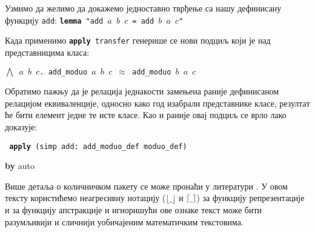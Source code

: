 Узмимо да желимо да докажемо једноставно тврђење са нашу дефинисану
функцију {\tt add}:
{\tt \textbf{lemma} "add $a$ $b$ $c$ = add $b$ $a$ $c$"}

Када применимо {\tt \textbf{apply} transfer} генерише се нови подциљ
који је над представницима класа:

{\tt $\bigwedge$ $a$ $b$ $c$. add\_moduo $a$ $b$ $c$ $\approx$ add\_moduo $b$ $a$ $c$}

Обратимо пажњу да је релација једнакости замењена раније дефинисаном
релацијом еквиваленције, односно како год изабрали представнике класе,
резултат ће бити елемент једне те исте класе. Као и раније овај подциљ
се врло лако доказује:

{\tt
\textbf{apply} (simp add: add\_moduo\_def moduo\_def)

\textbf{by} auto
}

Више детаља о количничком пакету се може пронаћи у литератури
\cite{isabelle-quotient,lifting-transfer}.  У овом тексту користићемо
неагресивну нотацију ($\lfloor\_\rfloor$ и $\lceil\_\rceil$) за
функцију репрезентације и за функцију апстракције и игноришући ове
ознаке текст може бити разумљивији и сличнији уобичајеним математичким
текстовима.





